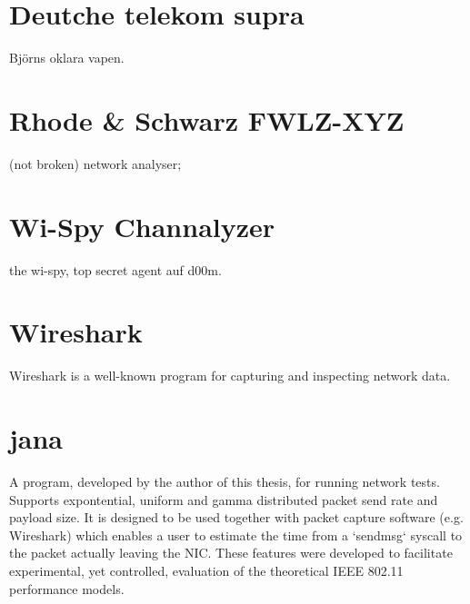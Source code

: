 \section{Deutche telekom supra}

Björns oklara vapen.

\section{Rhode \& Schwarz FWLZ-XYZ}

(not broken) network analyser;

\section{Wi-Spy Channalyzer}

the wi-spy, top secret agent auf d00m.

\section{Wireshark}

Wireshark is a well-known program for capturing and inspecting network data.

\section{jana}

A program, developed by the author of this thesis, for running network tests. Supports expontential, uniform and gamma distributed packet send rate and payload size. It is designed to be used together with packet capture software (e.g. Wireshark) which enables a user to estimate the time from a `sendmsg` syscall to the packet actually leaving the NIC. These features were developed to facilitate experimental, yet controlled, evaluation of the theoretical IEEE 802.11 performance models.